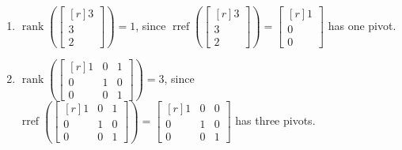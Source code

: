 \documentclass{problemset}
\DeclareMathOperator{\Rref}{rref}
\DeclareMathOperator{\Rank}{rank}
\newcommand{\rref}{\Rref}
\newcommand{\mat}[1]{\begin{bmatrix*}[r]#1\end{bmatrix*}}
\begin{document}
\begin{parts}
\begin{solution}
\begin{enumerate}
				\item $\Rank\left(\mat{3\\3\\2}\right)=1$, since 
					$\rref\left(\mat{3\\3\\2}\right)=\mat{1\\0\\0}$ has one pivot.
				\item $\Rank\left(\mat{1&0&1\\0&1&0\\0&0&1}\right)=3$, since
					$\rref\left(\mat{1&0&1\\0&1&0\\0&0&1}\right)=\mat{1&0&0\\0&1&0\\0&0&1}$
					has three pivots.
			\end{enumerate}
		\end{solution}
	\end{parts}
	
\end{document}
